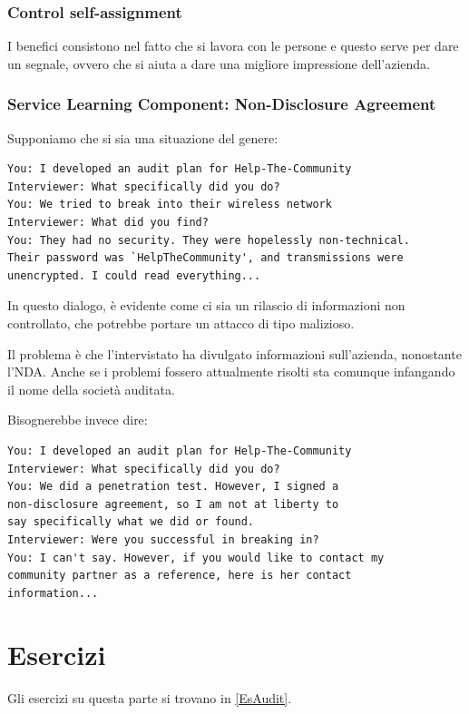 \subsubsection{Control self-assignment}
I benefici consistono nel fatto che si lavora con le persone e questo serve per
dare un segnale, ovvero che si aiuta a dare una migliore impressione
dell'azienda.



\subsubsection{Service Learning Component: Non-Disclosure Agreement}

Supponiamo che si sia una situazione del genere:

\begin{verbatim}
You: I developed an audit plan for Help-The-Community
Interviewer: What specifically did you do?
You: We tried to break into their wireless network
Interviewer: What did you find?
You: They had no security. They were hopelessly non-technical.
Their password was `HelpTheCommunity', and transmissions were
unencrypted. I could read everything...
\end{verbatim}

In questo dialogo, è evidente come ci sia un rilascio di informazioni non
controllato, che potrebbe portare un attacco di tipo malizioso.





Il problema è che l'intervistato ha divulgato informazioni sull'azienda,
nonostante l'NDA. Anche se i problemi fossero attualmente risolti sta comunque
infangando il nome della società auditata.


Bisognerebbe invece dire:
\begin{verbatim}
You: I developed an audit plan for Help-The-Community
Interviewer: What specifically did you do?
You: We did a penetration test. However, I signed a
non-disclosure agreement, so I am not at liberty to
say specifically what we did or found.
Interviewer: Were you successful in breaking in?
You: I can't say. However, if you would like to contact my
community partner as a reference, here is her contact
information...
\end{verbatim}

\section{Esercizi}
Gli esercizi su questa parte si trovano in \ref{EsAudit}.

